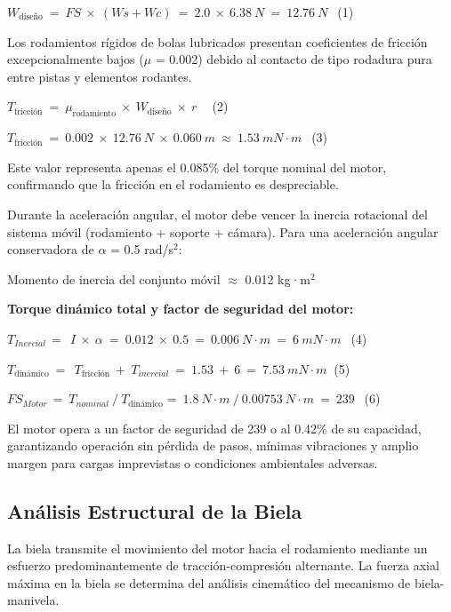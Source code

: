 \documentclass[12pt,a4paper,oneside]{report}
\begin{document}
\(W_{\text{diseño}}\  = \ FS\  \times \ (Ws + Wc)\  = \ 2.0\  \times \ 6.38\ N\  = \ 12.76\ N\ \ \) (1)

Los rodamientos rígidos de bolas lubricados presentan coeficientes de fricción excepcionalmente bajos (\ensuremath{\mu} = 0.002) debido al contacto de tipo rodadura pura entre pistas y elementos rodantes.

\(T_{\text{fricción}}\  = \ \mu_{\text{rodamiento}}\ \times \ W_{\text{diseño}}\  \times \ r\ \ \ \ \) (2)

\(T_{\text{fricción}}\  = \ 0.002\  \times \ 12.76\ N\  \times \ 0.060\ m\  \approx \ 1.53\ mN \cdot m\ \ \) (3)

Este valor representa apenas el 0.085\% del torque nominal del motor, confirmando que la fricción en el rodamiento es despreciable.

Durante la aceleración angular, el motor debe vencer la inercia rotacional del sistema móvil (rodamiento + soporte + cámara). Para una aceleración angular conservadora de \ensuremath{\alpha} = 0.5 rad/s\ensuremath{^{2}}:

Momento de inercia del conjunto móvil \ensuremath{\approx} 0.012 kg·m\ensuremath{^{2}}

\textbf{Torque dinámico total y factor de seguridad del motor:}

\(T_{Inercial\ } = \ \ I\  \times \ \alpha\  = \ 0.012\  \times \ 0.5\  = \ 0.006\ N \cdot m\  = \ 6\ mN \cdot m\ \ \) (4)

\(T_{\text{dinámico}}\  = \ \ T_{\text{fricción}}\  + \ T_{inercial}\  = \ 1.53\  + \ 6\  = \ 7.53\ mN \cdot m\ \) (5)

\({FS}_{Motor\ } = \ T_{nominal}\ /\ T_{\text{dinámico}} = \ 1.8\ N \cdot m\ /\ 0.00753\ N \cdot m\  = \ 239\ \ \) (6)

El motor opera a un factor de seguridad de 239 o al 0.42\% de su capacidad, garantizando operación sin pérdida de pasos, mínimas vibraciones y amplio margen para cargas imprevistas o condiciones ambientales adversas.

\subsection{Análisis Estructural de la Biela}\label{anuxe1lisis-estructural-de-la-biela}

La biela transmite el movimiento del motor hacia el rodamiento mediante un esfuerzo predominantemente de tracción-compresión alternante. La fuerza axial máxima en la biela se determina del análisis cinemático del mecanismo de biela-manivela.
\end{document}

